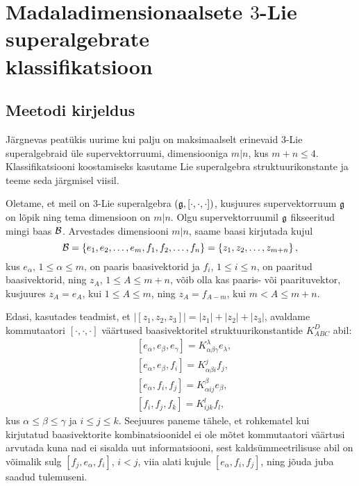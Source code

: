

\section[Madaladimensionaalsete \texorpdfstring{$3$}{3}-Lie superalgebrate
klassifikatsioon]{Madaladimensionaalsete \texorpdfstring{$3$}{3}-Lie
superalgebrate \\ klassifikatsioon}\label{section:klassifikatsioon}

\subsection{Meetodi kirjeldus}

Järgnevas peatükis uurime kui palju on maksimaalselt erinevaid $3$-Lie
superalgebraid üle supervektorruumi, dimensiooniga $m|n$, kus $m + n \leq 4$.
Klassifikatsiooni koostamiseks kasutame Lie superalgebra struktuurikonstante
ja teeme seda järgmisel viisil.

Oletame, et meil on 3-Lie superalgebra $(\mathfrak{g}, [\cdot, \cdot, \cdot])$,
kusjuures supervektorruum $\mathfrak{g}$ on lõpik ning tema dimensioon on $m|n$. Olgu
supervektorruumil $\mathfrak{g}$ fikseeritud mingi baas $\mathcal{B}$. Arvestades dimensiooni
$m|n$, saame baasi kirjutada kujul
\[
    \mathcal{B} = \left\{ e_1, e_2, \dots, e_m, f_1, f_2, \dots, f_n \right\} =
         \left\{ z_1, z_2, \dots, z_{m+n} \right\},
\]
kus $e_\alpha$, $1 \leq \alpha \leq m$, on paaris baasivektorid ja
$f_i$, $1 \leq i \leq n$, on paaritud baasivektorid, ning $z_A$,
$1 \leq A \leq m+n$, võib olla kas paaris- või paarituvektor, kusjuures
$z_A = e_A$, kui $1 \leq A \leq m$, ning $z_A = f_{A-m}$, kui
$m < A \leq m+n$.

Edasi, kasutades teadmist, et $|[z_1, z_2, z_3]| = |z_1| + |z_2| + |z_3|$,
avaldame kommutaatori $[\cdot, \cdot, \cdot]$ väärtused baasivektoritel
struktuurikonstantide $K_{ABC}^D$ abil:
\begin{align*}
    &[e_\alpha, e_\beta, e_\gamma] =
        K_{\alpha \beta \gamma}^\lambda e_\lambda, \\
    &[e_\alpha, e_\beta, f_i] = K_{\alpha \beta i}^j f_j, \\
    &[e_\alpha, f_i, f_j] = K_{\alpha i j}^\beta e_\beta, \\
    &[f_i, f_j, f_k] = K_{i j k}^l f_l,
\end{align*}
kus $\alpha \leq \beta \leq \gamma$ ja $i \leq j \leq  k$.
Seejuures paneme tähele, et rohkematel kui kirjutatud baasivektorite
kombinatsioonidel ei ole mõtet kommutaatori väärtusi arvutada kuna nad ei
sisalda uut informatsiooni, sest kaldsümmeetrilisuse abil on võimalik
sulg $[f_j, e_\alpha, f_i]$, $i < j$, viia alati kujule $[e_\alpha, f_i, f_j]$,
ning jõuda juba saadud tulemuseni.

